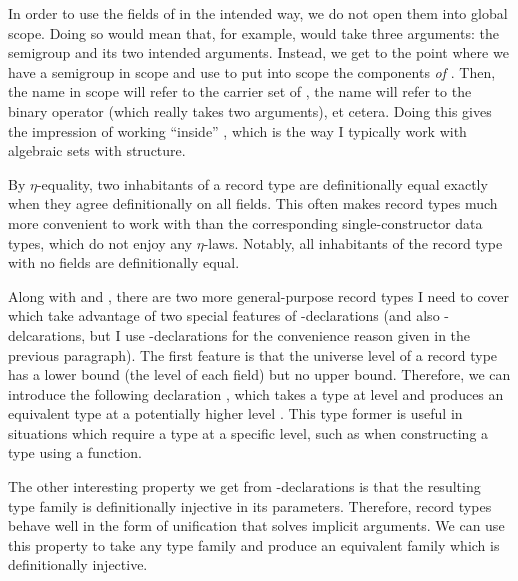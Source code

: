 
In order to use the fields of  in the intended way, we
do not open them into global scope.
Doing so would mean that, for example, \AgdaField{\_$\bullet$\_} would take
three arguments: the semigroup and its two intended arguments.
Instead, we get to the point where we have a semigroup  in scope
and use
\AgdaSpace{}\AgdaSpace{}
to put into scope the components \emph{of }.
Then, the name  in scope will refer to the carrier set of
, the name \AgdaField{\_$\bullet$\_} will refer to the binary
operator (which really takes two arguments), et cetera.
Doing this gives the impression of working ``inside'' , which is
the way I typically work with algebraic sets with structure.

By $\eta$-equality, two inhabitants of a record type are definitionally equal
exactly when they agree definitionally on all fields.
This often makes record types much more convenient to work with than the
corresponding single-constructor data types, which do not enjoy any $\eta$-laws.
Notably, all inhabitants of the record type \AgdaRecord{$\top$} with no fields
are definitionally equal.

Along with \AgdaRecord{$\Upsigma$} and \AgdaRecord{$\top$}, there are two more
general-purpose record types I need to cover which take advantage of two special
features of -declarations (and also
-delcarations, but I use -declarations for
the convenience reason given in the previous paragraph).
The first feature is that the universe level of a record type has a lower bound
(the level of each field) but no upper bound.
Therefore, we can introduce the following declaration , which
takes a type  at level  and produces an equivalent
type at a potentially higher level
\AgdaSpace{}\AgdaOperator{\AgdaPrimitive{$\sqcup$}}\AgdaSpace{}%
\AgdaBound{$\ell$}.
This type former is useful in situations which require a type at a specific
level, such as when constructing a type using a function.


The other interesting property we get from -declarations is
that the resulting type family is definitionally injective in its parameters.
Therefore, record types behave well in the form of unification that solves
implicit arguments.
We can use this property to take any type family  and produce an
equivalent family \AgdaSpace{} which is
definitionally injective.


